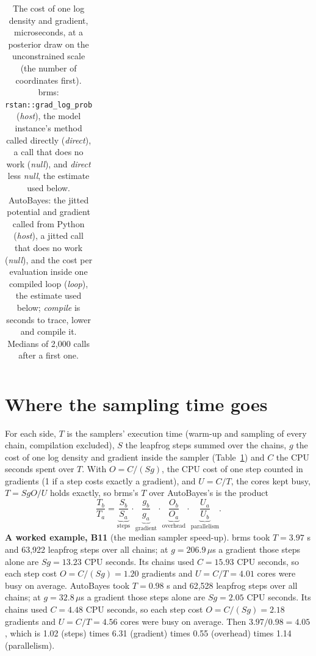 \documentclass[11pt]{article}
\newcommand{\code}[1]{\texttt{#1}}
\begin{document}
\begin{table}[H]
\begin{center}
\begin{tabular}{@{}lrrrrrrrrrr@{}}
\end{tabular}\end{center}
\caption{\small The cost of one log density and gradient, microseconds, at a posterior draw on the unconstrained scale (the number of coordinates first). brms: \code{rstan::grad\_log\_prob} (\emph{host}), the model instance's method called directly (\emph{direct}), a call that does no work (\emph{null}), and \emph{direct} less \emph{null}, the estimate used below. AutoBayes: the jitted potential and gradient called from Python (\emph{host}), a jitted call that does no work (\emph{null}), and the cost per evaluation inside one compiled loop (\emph{loop}), the estimate used below; \emph{compile} is seconds to trace, lower and compile it. Medians of 2,000 calls after a first one.}\label{tab:grad}
\end{table}

\section{Where the sampling time goes}\label{sec:decomp}

For each side, $T$ is the samplers' execution time (warm-up and sampling of every chain, compilation excluded), $S$ the leapfrog steps summed over the chains, $g$ the cost of one log density and gradient inside the sampler (Table~\ref{tab:grad}) and $C$ the CPU seconds spent over $T$. With $O = C/(Sg)$, the CPU cost of one step counted in gradients (1 if a step costs exactly a gradient), and $U = C/T$, the cores kept busy, $T = S g O / U$ holds exactly, so brms's $T$ over AutoBayes's is the product
\[ \frac{T_b}{T_a} = \underbrace{\frac{S_b}{S_a}}_{\text{steps}} \cdot \underbrace{\frac{g_b}{g_a}}_{\text{gradient}} \cdot \underbrace{\frac{O_b}{O_a}}_{\text{overhead}} \cdot \underbrace{\frac{U_a}{U_b}}_{\text{parallelism}}. \]
\textbf{A worked example, B11} (the median sampler speed-up). brms took $T = 3.97$ s and 63,922 leapfrog steps over all chains; at $g = 206.9\,\mu$s a gradient those steps alone are $S g = 13.23$ CPU seconds. Its chains used $C = 15.93$ CPU seconds, so each step cost $O = C/(Sg) = 1.20$ gradients and $U = C/T = 4.01$ cores were busy on average. AutoBayes took $T = 0.98$ s and 62,528 leapfrog steps over all chains; at $g = 32.8\,\mu$s a gradient those steps alone are $S g = 2.05$ CPU seconds. Its chains used $C = 4.48$ CPU seconds, so each step cost $O = C/(Sg) = 2.18$ gradients and $U = C/T = 4.56$ cores were busy on average. Then $3.97/0.98 = 4.05$, which is 1.02 (steps) times 6.31 (gradient) times 0.55 (overhead) times 1.14 (parallelism).
\end{document}
